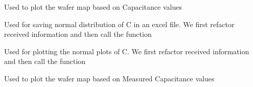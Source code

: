 \documentclass[letterpaper,10pt,english]{sphinxmanual}
\begin{document}
\begin{fulllineitems}
\label{\detokenize{app:app.C_WM}}
\pysigstartsignatures
{}
\pysigstopsignatures
\sphinxAtStartPar
Used to plot the wafer map based on Capacitance values

\end{fulllineitems}


\begin{fulllineitems}
\label{\detokenize{app:app.C_excel_normal}}
\pysigstartsignatures
{}
\pysigstopsignatures
\sphinxAtStartPar
Used for saving normal distribution of C in an excel file.
We first refactor received information and then call the function

\end{fulllineitems}


\begin{fulllineitems}
\label{\detokenize{app:app.C_normal}}
\pysigstartsignatures
{}
\pysigstopsignatures
\sphinxAtStartPar
Used for plotting the normal plots of C.
We first refactor received information and then call the function

\end{fulllineitems}


\begin{fulllineitems}
\label{\detokenize{app:app.Cmes_WM}}
\pysigstartsignatures
{}
\pysigstopsignatures
\sphinxAtStartPar
Used to plot the wafer map based on Measured Capacitance values

\end{fulllineitems}
\end{document}
